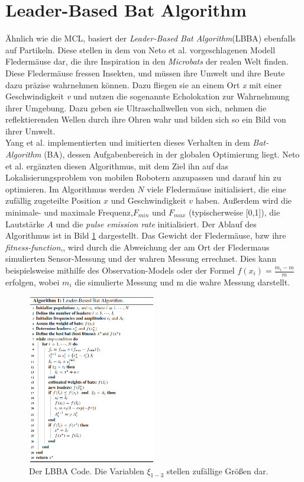 \section{Leader-Based Bat Algorithm}\label{sec:lbba}
Ähnlich wie die MCL, basiert der \textit{Leader-Based Bat Algorithm}(LBBA) ebenfalls auf Partikeln. Diese stellen in dem von Neto et al.\cite{LBBA} vorgeschlagenen Modell Fledermäuse dar, die ihre Inspiration in den \textit{Microbats} der realen Welt finden. Diese Fledermäuse fressen Insekten, und müssen ihre Umwelt und ihre Beute dazu präzise wahrnehmen können. Dazu fliegen sie an einem Ort \textit{x} mit einer Geschwindigkeit \textit{v} und nutzen die sogenannte Echolokation zur Wahrnehmung ihrer Umgebung. Dazu geben sie Ultraschallwellen von sich, nehmen die reflektierenden Wellen durch ihre Ohren wahr und bilden sich so ein Bild von ihrer Umwelt.\\
Yang et al.\cite{BA} implementierten und imitierten dieses Verhalten in dem \textit{Bat-Algorithm} (BA), dessen Aufgabenbereich in der globalen Optimierung liegt. Neto et al.\cite{LBBA} ergänzten diesen Algorithmus, mit dem Ziel ihn auf das Lokalisierungsproblem von mobilen Robotern anzupassen und darauf hin zu optimieren. Im Algorithmus werden $N$ viele Fledermäuse initialisiert, die eine zufällig zugeteilte Position $x$ und Geschwindigkeit $v$ haben. Außerdem wird die minimale- und maximale Frequenz,$F_{min}$ und $F_{max}$  (typischerweise [0,1]), die Lautstärke $A$ und die \textit{pulse emission rate} initialisiert. Der Ablauf des Algorithmus ist in Bild \ref{fig:lbba_code} dargestellt. Das Gewicht der Fledermäuse, bzw ihre \textit{fitness-function},, wird durch die Abweichung der am Ort der Fledermaus simulierten Sensor-Messung und der wahren Messung errechnet. Dies kann beispielsweise mithilfe des Observation-Models oder der Formel $f(x_i) = \frac{m_i -m}{m}$ erfolgen, wobei $m_i$ die simulierte Messung und m die wahre Messung darstellt.\\
\begin{figure}[ht]
    \centering
    \includegraphics[width=0.5\textwidth]{pic/loesungen/20_lbba_algorithm.png}
    \caption{Der LBBA Code\cite{LBBA}. Die Variablen $\xi_{1-3}$ stellen zufällige Größen dar.}
    \label{fig:lbba_code}
\end{figure}
